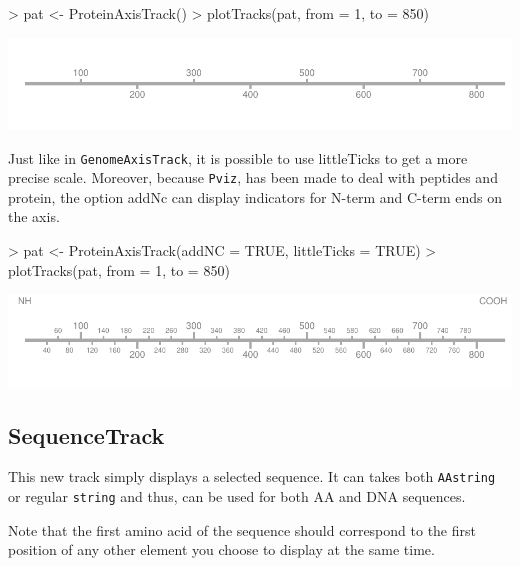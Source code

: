 \documentclass[11pt]{article}
\begin{document}
\begin{Schunk}
\begin{Sinput}
> pat <- ProteinAxisTrack()
> plotTracks(pat, from = 1, to = 850)
\end{Sinput}
\end{Schunk}
\includegraphics{Pviz-ProteinAxisTrack-basic}

Just like in \texttt{GenomeAxisTrack}, it is possible to use littleTicks to get
a more precise scale. Moreover, because \texttt{Pviz}, has been made to deal
with peptides and protein, the option addNc can display indicators for N-term
and C-term ends on the axis.

\begin{Schunk}
\begin{Sinput}
> pat <- ProteinAxisTrack(addNC = TRUE, littleTicks = TRUE)
> plotTracks(pat, from = 1, to = 850)
\end{Sinput}
\end{Schunk}
\includegraphics{Pviz-ProteinAxisTrack-options}

\subsection{SequenceTrack}
This new track simply displays a selected sequence. It can takes both
\texttt{AAstring} or regular \texttt{string} and thus, can be used for both
AA and DNA sequences.

Note that the first amino acid of the sequence should correspond to the first
position of any other element you choose to display at the same time.
\end{document}
